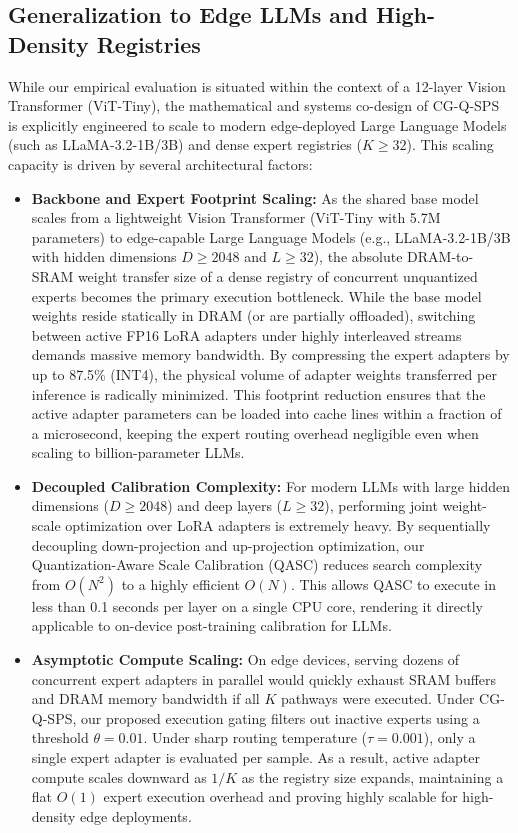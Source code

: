 \subsection{Generalization to Edge LLMs and High-Density Registries}
While our empirical evaluation is situated within the context of a 12-layer Vision Transformer (ViT-Tiny), the mathematical and systems co-design of CG-Q-SPS is explicitly engineered to scale to modern edge-deployed Large Language Models (such as LLaMA-3.2-1B/3B) and dense expert registries ($K \ge 32$). This scaling capacity is driven by several architectural factors:
\begin{itemize}
  \item \textbf{Backbone and Expert Footprint Scaling:} As the shared base model scales from a lightweight Vision Transformer (ViT-Tiny with 5.7M parameters) to edge-capable Large Language Models (e.g., LLaMA-3.2-1B/3B with hidden dimensions $D \ge 2048$ and $L \ge 32$), the absolute DRAM-to-SRAM weight transfer size of a dense registry of concurrent unquantized experts becomes the primary execution bottleneck. While the base model weights reside statically in DRAM (or are partially offloaded), switching between active FP16 LoRA adapters under highly interleaved streams demands massive memory bandwidth. By compressing the expert adapters by up to 87.5\% (INT4), the physical volume of adapter weights transferred per inference is radically minimized. This footprint reduction ensures that the active adapter parameters can be loaded into cache lines within a fraction of a microsecond, keeping the expert routing overhead negligible even when scaling to billion-parameter LLMs.
  \item \textbf{Decoupled Calibration Complexity:} For modern LLMs with large hidden dimensions ($D \ge 2048$) and deep layers ($L \ge 32$), performing joint weight-scale optimization over LoRA adapters is extremely heavy. By sequentially decoupling down-projection and up-projection optimization, our Quantization-Aware Scale Calibration (QASC) reduces search complexity from $O(N^2)$ to a highly efficient $O(N)$. This allows QASC to execute in less than 0.1 seconds per layer on a single CPU core, rendering it directly applicable to on-device post-training calibration for LLMs.
  \item \textbf{Asymptotic Compute Scaling:} On edge devices, serving dozens of concurrent expert adapters in parallel would quickly exhaust SRAM buffers and DRAM memory bandwidth if all $K$ pathways were executed. Under CG-Q-SPS, our proposed execution gating filters out inactive experts using a threshold $\theta=0.01$. Under sharp routing temperature ($\tau=0.001$), only a single expert adapter is evaluated per sample. As a result, active adapter compute scales downward as $1/K$ as the registry size expands, maintaining a flat $O(1)$ expert execution overhead and proving highly scalable for high-density edge deployments.

\end{itemize}
